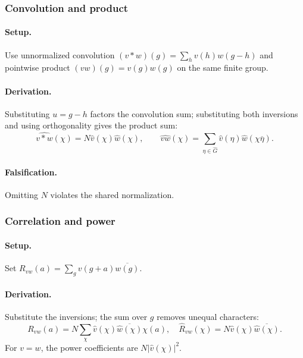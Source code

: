 
\subsubsection{Convolution and product}
\paragraph{Setup.}
Use unnormalized convolution \((v*w)(g)=\sum_h v(h)w(g-h)\) and pointwise
product \((vw)(g)=v(g)w(g)\) on the same finite group.
\paragraph{Derivation.} Substituting \(u=g-h\) factors the convolution sum;
substituting both inversions and using orthogonality gives the product sum:
\begin{equation}
\widehat{v*w}(\chi)=N\widehat v(\chi)\widehat w(\chi),\qquad
\widehat{vw}(\chi)=\sum_{\eta\in\widehat G}
\widehat v(\eta)\widehat w(\chi\overline\eta).
\label{eq:fourier-convolution-product}
\end{equation}
\paragraph{Falsification.} Omitting \(N\) violates the shared normalization.


\subsubsection{Correlation and power}
\paragraph{Setup.}
Set \(R_{vw}(a)=\sum_g v(g+a)\overline{w(g)}\).
\paragraph{Derivation.} Substitute the inversions;
the sum over \(g\) removes unequal characters:
\begin{equation}
R_{vw}(a)=N\sum_\chi\widehat v(\chi)\overline{\widehat w(\chi)}\chi(a),
\quad \widehat R_{vw}(\chi)=N\widehat v(\chi)\overline{\widehat w(\chi)}.
\label{eq:fourier-correlation-power}
\end{equation}
For \(v=w\), the power coefficients are \(N|\widehat v(\chi)|^2\).
